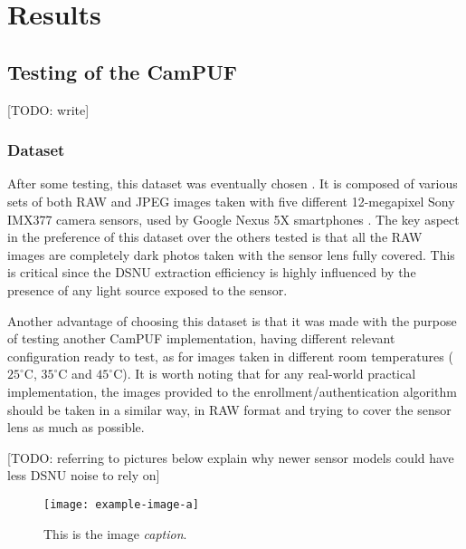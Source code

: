 \chapter{Results}

\section{Testing of the CamPUF}
[TODO: write]

\subsection{Dataset}\label{sec:dataset}
After some testing, this dataset was eventually chosen \cite{dataset_url}. It is composed of various sets of both RAW and JPEG images taken with five different 12-megapixel Sony IMX377 camera sensors, used by Google Nexus 5X smartphones \cite{dataset_explanation}. The key aspect in the preference of this dataset over the others tested is that all the RAW images are completely dark photos taken with the sensor lens fully covered. This is critical since the DSNU extraction efficiency is highly influenced by the presence of any light source exposed to the sensor.

Another advantage of choosing this dataset is that it was made with the purpose of testing another CamPUF implementation, having different relevant configuration ready to test, as for images taken in different room temperatures ($25^{\circ}$C, $35^{\circ}$C and $45^{\circ}$C). It is worth noting that for any real-world practical implementation, the images provided to the enrollment/authentication algorithm should be taken in a similar way, in RAW format and trying to cover the sensor lens as much as possible.

[TODO: referring to pictures below explain why newer sensor models could have less DSNU noise to rely on]

\begin{figure}[h!]
	\vspace{0.5cm}
	\texttt{[image: example-image-a]}
	\caption{This is the image \emph{caption}.}
	\label{fig:dataset}
\end{figure} 

